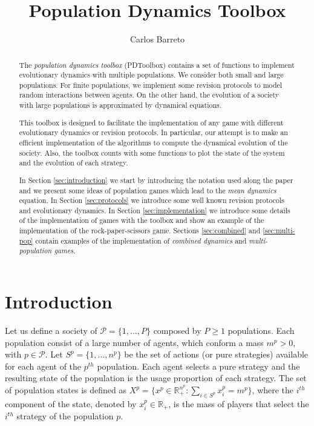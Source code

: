 \documentclass[a4paper,10pt]{article}
\title{Population Dynamics Toolbox}
\author{Carlos Barreto}
\def\th{^{th}}
\newcommand{\pop}{\mathcal{P}}
\def\th{^{th}}
\begin{document}
\maketitle



\begin{abstract}
 The \emph{population dynamics toolbox} (PDToolbox) contains a set of functions to implement evolutionary dynamics with multiple populations. We consider both small and large populations. For finite populations, we implement some revision protocols to model random interactions between agents. On the other hand, the evolution of a society with large populations is approximated by dynamical equations. 
 
 This toolbox is designed to facilitate the implementation of any game with different evolutionary dynamics or revision protocols.  In particular, our attempt is to make an efficient implementation of the algorithms to compute the dynamical evolution of the society. Also, the toolbox counts with some functions to plot the state of the system and the evolution of each strategy.
 
 In Section \ref{sec:introduction} we start by introducing the notation used along the paper and we present some ideas of population games which lead to the \emph{mean dynamics} equation. In Section \ref{sec:protocols} we introduce some well known revision protocols and evolutionary dynamics. In Section \ref{sec:implementation} we introduce some details of the implementation of games with the toolbox and show an example of the implementation of the rock-paper-scissors game.
 Sections \ref{sec:combined} and \ref{sec:multi-pop} contain examples of the implementation of \emph{combined dynamics} and \emph{multi-population games}.
 
\end{abstract}


\tableofcontents



\section{Introduction} \label{sec:introduction}



Let us define a society of $\pop = \{ 1, \ldots, P\}$ composed by $P \geq 1$ populations. Each population consist of a large number of agents, which conform a mass $m^p > 0$, with $p \in \pop$. 
Let $S^p = \{ 1, \ldots, n^p \}$ be the set of actions (or pure strategies) available for each agent of the $p\th$ population. 
Each agent selects a pure strategy and the resulting state of the population is the usage proportion of each strategy. The set of population states is defined as $X^p = \{ x^p \in \mathbb{R}_+^{n^p} : \sum_{i \in S^p} x_i^p = m^p \}$, where the $i\th$ component of the state, denoted by $x_i^p \in \mathbb{R}_+$, is the mass of players that select the $i\th$ strategy of the population $p$.
\end{document}
